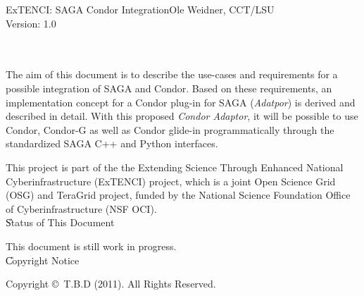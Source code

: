 
\newcommand{\sagadocument}{ExTENCI: SAGA Condor Integration}
\newcommand{\sagaversion}{1.0}
\newcommand{\sagabasename}{saga-programming-guide}
\newcommand{\sagaemail}{saga-users@cct.lsu.edu}



\newcommand{\name}{\F{SAGA}\xspace}
\DefineShortVerb{\|}



 \thispagestyle{empty}

 \sagadocument\hfill  Ole Weidner, CCT/LSU\\
  Version: \sagaversion \hfill {\sagadate}


  \hrulefill\\[2em]

  \\[4em]




   The aim of this document is to describe the use-cases and requirements 
   for a possible integration of SAGA and Condor. Based on these requirements, 
   an implementation concept for a Condor plug-in for SAGA (\textit{Adatpor}) is 
   derived and described in detail. 
   With this proposed \textit{Condor Adaptor}, it will be possible to use Condor,
   Condor-G as
   well as Condor glide-in programmatically through the standardized SAGA C++ and 
   Python interfaces.
   
   This project is part of the the Extending Science Through Enhanced National 
   Cyberinfrastructure (ExTENCI) project, which is a joint Open Science Grid (OSG)
   and TeraGrid project, funded by the National Science Foundation Office of 
   Cyberinfrastructure (NSF OCI).
   \\[2em]


  \U{Status of This Document}

  This document is still work in progress.\\
  
    \U{Copyright Notice}

  Copyright \copyright~T.B.D (2011).  All Rights
  Reserved.\\

  \newpage

  \tableofcontents

  \newpage

                                        
